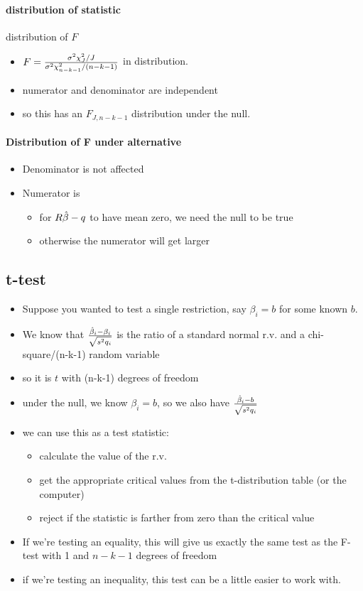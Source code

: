 \paragraph{distribution of statistic}
       distribution of $F$
\begin{itemize}
\item $F = {\sigma^2 \chi^2_J / J \over \sigma^2 \chi^2_{n-k-1} / (n-k-1)}$ in
  distribution.
\item numerator and denominator are independent
\item so this has an $F_{J, n-k-1}$ distribution under the null.
\end{itemize}

\paragraph{Distribution of F under alternative}
\begin{itemize}
\item Denominator is not affected
\item Numerator is
\begin{itemize}
\item for $R\hat{\beta} - q$ to have mean zero, we need the null to
          be true
\item otherwise the numerator will get larger
\end{itemize}
\end{itemize}

\subsection{t-test}

\begin{itemize}[leftmargin=0pt]

\item Suppose you wanted to test a single restriction, say $\beta_i = b$
  for some known $b$.
\item We know that ${\hat{\beta}_i - \beta_i \over \sqrt{s^2 q_i}}$ is the ratio of
  a standard normal r.v. and a chi-square/(n-k-1) random variable
\item so it is $t$ with (n-k-1) degrees of freedom
\item under the null, we know $\beta_i = b$, so we also have ${\hat{\beta}_i - b
    \over \sqrt{s^2 q_i}}$
\item we can use this as a test statistic:
  \begin{itemize}
  \item calculate the value of the r.v.
  \item get the appropriate critical values from the t-distribution
    table (or the computer)
  \item reject if the statistic is farther from zero than the critical
    value
  \end{itemize}
\item If we're testing an equality, this will give us exactly the same
  test as the F-test with 1 and $n-k-1$ degrees of freedom
\item if we're testing an inequality, this test can be a little easier
  to work with.
\end{itemize}

